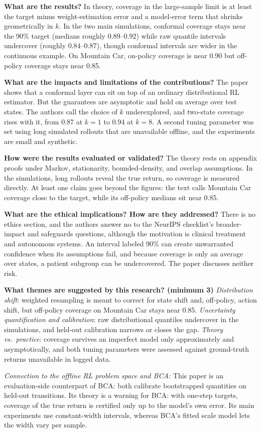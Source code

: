\documentclass[11pt]{article}
\newcommand{\q}[2]{\item \textbf{#1} #2}
\newcommand{\tiein}[1]{\par\smallskip\noindent\emph{Connection to the offline RL problem space and BCA:} #1\par\medskip}
\begin{document}
\begin{qna}
\q{What are the results?}
In theory, coverage in the large-sample limit is at least the target minus weight-estimation error and a model-error term that shrinks geometrically in $k$. In the two main simulations, conformal coverage stays near the 90\% target (medians roughly 0.89--0.92) while raw quantile intervals undercover (roughly 0.84--0.87), though conformal intervals are wider in the continuous example. On Mountain Car, on-policy coverage is near 0.90 but off-policy coverage stays near 0.85.

\q{What are the impacts and limitations of the contributions?}
The paper shows that a conformal layer can sit on top of an ordinary distributional RL estimator. But the guarantees are asymptotic and hold on average over test states. The authors call the choice of $k$ underexplored, and two-state coverage rises with it, from 0.87 at $k=1$ to 0.94 at $k=8$. A second tuning parameter was set using long simulated rollouts that are unavailable offline, and the experiments are small and synthetic.

\q{How were the results evaluated or validated?}
The theory rests on appendix proofs under Markov, stationarity, bounded-density, and overlap assumptions. In the simulations, long rollouts reveal the true return, so coverage is measured directly. At least one claim goes beyond the figures: the text calls Mountain Car coverage close to the target, while its off-policy medians sit near 0.85.

\q{What are the ethical implications? How are they addressed?}
There is no ethics section, and the authors answer no to the NeurIPS checklist's broader-impact and safeguards questions, although the motivation is clinical treatment and autonomous systems. An interval labeled 90\% can create unwarranted confidence when its assumptions fail, and because coverage is only an average over states, a patient subgroup can be undercovered. The paper discusses neither risk.

\q{What themes are suggested by this research? (minimum 3)}
\emph{Distribution shift}: weighted resampling is meant to correct for state shift and, off-policy, action shift, but off-policy coverage on Mountain Car stays near 0.85. \emph{Uncertainty quantification and calibration}: raw distributional quantiles undercover in the simulations, and held-out calibration narrows or closes the gap. \emph{Theory vs.\ practice}: coverage survives an imperfect model only approximately and asymptotically, and both tuning parameters were assessed against ground-truth returns unavailable in logged data.

\end{qna}
\tiein{This paper is an evaluation-side counterpart of BCA: both calibrate bootstrapped quantities on held-out transitions. Its theory is a warning for BCA: with one-step targets, coverage of the true return is certified only up to the model's own error. Its main experiments use constant-width intervals, whereas BCA's fitted scale model lets the width vary per sample.}
\end{document}
